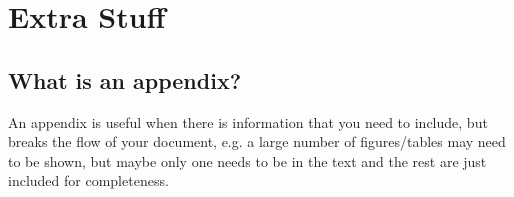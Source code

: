 \documentclass[a4paper,twoside,12pt]{report}
\begin{document}
\appendix
\chapter{Extra Stuff}\label{app:extra}
\section{What is an appendix?}\label{app:whatis}

An appendix is useful when there is information that you need to include, but breaks the flow of your document, e.g. a large number of figures/tables may need to be shown, but maybe only one needs to be in the text and the rest are just included for completeness.

\nocite{*}

\end{document}
